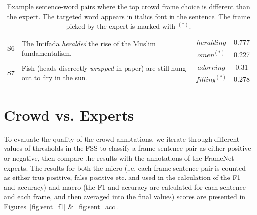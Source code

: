 \begin{table}[tb!]
{\begin{tabular}{cp{8cm}cc}
\multirow{2}{*}{S6} & \multirow{2}{8cm}{The Intifada \textit{heralded} the rise of the Muslim fundamentalism.} & $heralding$ & 0.777 \\  %
& & $omen^{(*)}$ & 0.227 \\ \hline

\multirow{2}{*}{S7} & \multirow{2}{8cm}{Fish (heads discreetly \textit{wrapped} in paper) are still hung out to dry in the sun.} & $adorning$ & 0.31 \\  %
& & $filling^{(*)}$ & 0.278 \\ %
\bottomrule
\end{tabular}
}

\caption{Example sentence-word pairs where the top crowd frame choice is different than the expert. The targeted word appears in italics font in the sentence. The frame picked by the expert is marked with $^{(*)}$.}
\label{tab:disagr}
\end{table}

\section{Crowd vs. Experts}
\label{sec:frame-crowd-exp}

To evaluate the quality of the crowd annotations, we iterate through different values of thresholds in the FSS to classify a frame-sentence pair as either positive or negative, then compare the results with the annotations of the FrameNet experts. The results for both the micro (i.e. each frame-sentence pair is counted as either true positive, false positive etc. and used in the calculation of the F1 and accuracy) and macro (the F1 and accuracy are calculated for each sentence and each frame, and then averaged into the final values) scores are presented in Figures~\ref{fig:sent_f1} \&~\ref{fig:sent_acc}.

